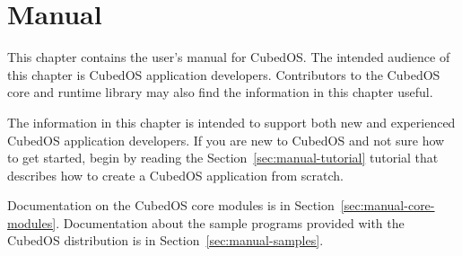 
\newpage
\chapter{Manual}
\label{chapt:manual}

This chapter contains the user's manual for CubedOS. The intended audience of this chapter is
CubedOS application developers. Contributors to the CubedOS core and runtime library may also
find the information in this chapter useful.

The information in this chapter is intended to support both new and experienced CubedOS
application developers. If you are new to CubedOS and not sure how to get started, begin by
reading the Section~\ref{sec:manual-tutorial} tutorial that describes how to create a CubedOS
application from scratch.

Documentation on the CubedOS core modules is in Section~\ref{sec:manual-core-modules}.
Documentation about the sample programs provided with the CubedOS distribution is in
Section~\ref{sec:manual-samples}.





